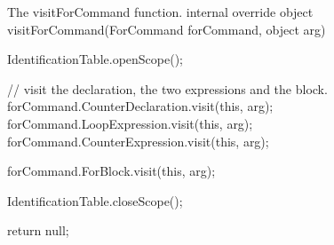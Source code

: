 \begin{source}{The visitForCommand function.}{}
internal override object visitForCommand(ForCommand forCommand, object arg)
		{
				IdentificationTable.openScope();

        // visit the declaration, the two expressions and the block.
        forCommand.CounterDeclaration.visit(this, arg);
        forCommand.LoopExpression.visit(this, arg);
        forCommand.CounterExpression.visit(this, arg);

        forCommand.ForBlock.visit(this, arg);

        IdentificationTable.closeScope();
						
        return null;
    }
\end{source}

